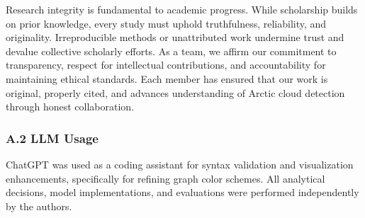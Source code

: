 \documentclass[11pt]{article}
\begin{document}
Research integrity is fundamental to academic progress. While
scholarship builds on prior knowledge, every study must uphold
truthfulness, reliability, and originality. Irreproducible methods or
unattributed work undermine trust and devalue collective scholarly
efforts. As a team, we affirm our commitment to transparency, respect
for intellectual contributions, and accountability for maintaining
ethical standards. Each member has ensured that our work is original,
properly cited, and advances understanding of Arctic cloud detection
through honest collaboration.

    \subsubsection*{A.2 LLM Usage}\label{a.2-llm-usage}

ChatGPT was used as a coding assistant for syntax validation and
visualization enhancements, specifically for refining graph color
schemes. All analytical decisions, model implementations, and
evaluations were performed independently by the authors.


    
    
    
\end{document}
